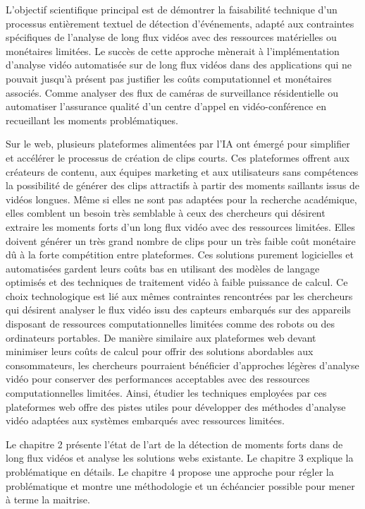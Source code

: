 L'objectif scientifique principal est de démontrer la faisabilité technique d'un processus entièrement textuel de détection d'événements, adapté aux contraintes spécifiques de l’analyse de long flux vidéos avec des ressources matérielles ou monétaires limitées. Le succès de cette approche mènerait à l’implémentation d’analyse vidéo automatisée sur de long flux vidéos dans des applications qui ne pouvait jusqu’à présent pas justifier les coûts computationnel et monétaires associés. Comme analyser des flux de caméras de surveillance résidentielle ou automatiser l’assurance qualité d’un centre d’appel en vidéo-conférence en recueillant les moments problématiques.

Sur le web, plusieurs plateformes alimentées par l’IA ont émergé pour simplifier et accélérer le processus de création de clips courts. Ces plateformes offrent aux créateurs de contenu, aux équipes marketing et aux utilisateurs sans compétences la possibilité de générer des clips attractifs à partir des moments saillants issus de vidéos longues. Même si elles ne sont pas adaptées pour la recherche académique, elles comblent un besoin très semblable à ceux des chercheurs qui désirent extraire les moments forts d’un long flux vidéo avec des ressources limitées. Elles doivent générer un très grand nombre de clips pour un très faible coût monétaire dû à la forte compétition entre plateformes. Ces solutions purement logicielles et automatisées gardent leurs coûts bas en utilisant des modèles de langage optimisés et des techniques de traitement vidéo à faible puissance de calcul. Ce choix technologique est lié aux mêmes contraintes rencontrées par les chercheurs qui désirent analyser le flux vidéo issu des capteurs embarqués sur des appareils disposant de ressources computationnelles limitées comme des robots ou des ordinateurs portables. De manière similaire aux plateformes web devant minimiser leurs coûts de calcul pour offrir des solutions abordables aux consommateurs, les chercheurs pourraient bénéficier d'approches légères d’analyse vidéo pour conserver des performances acceptables avec des ressources computationnelles limitées. Ainsi, étudier les techniques employées par ces plateformes web offre des pistes utiles pour développer des méthodes d'analyse vidéo adaptées aux systèmes embarqués avec ressources limitées.

Le chapitre 2 présente l’état de l’art de la détection de moments forts dans de long flux vidéos et analyse les solutions webs existante. 
Le chapitre 3 explique la problématique en détails. 
Le chapitre 4 propose une approche pour régler la problématique et montre une méthodologie et un échéancier possible pour mener à terme la maitrise.





